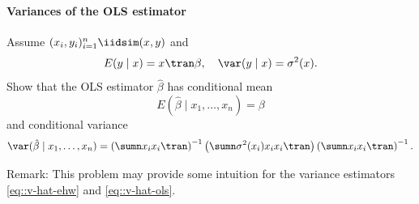 \paragraph{Variances of the OLS estimator}\label{hw::variance-ols-estimator}


Assume $(x_{i},y_{i})_{i=1}^{n} \iidsim (x,y)$ and 
$$
E(y\mid x) = x\tran \beta,\quad \var(y\mid x) = \sigma^2(x).
$$
Show that the OLS estimator $\hat{\beta}$ has conditional mean
$$
E( \hat{\beta} \mid x_1,\ldots, x_n ) = \beta 
$$
and conditional variance
$$
\var( \hat{\beta} \mid x_1,\ldots, x_n )
= \left(\sumn x_{i}x_{i} \tran \right)^{-1}
\left(\sumn \sigma^2(x_i) x_{i}x_{i} \tran \right)
\left(\sumn x_{i}x_{i} \tran \right)^{-1}.
$$

 


Remark: This problem may provide some intuition for the variance estimators
\eqref{eq::v-hat-ehw} and \eqref{eq::v-hat-ols}.

